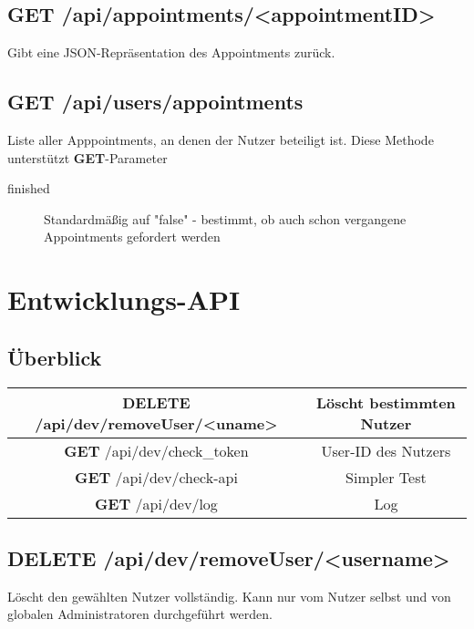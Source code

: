 \documentclass[11pt,a4paper]{article}
\begin{document}
\subsection{\textbf{GET} /api/appointments/<appointmentID>}
Gibt eine JSON-Repräsentation des Appointments zurück.
\subsection{\textbf{GET} /api/users/appointments}
Liste aller Apppointments, an denen der Nutzer beteiligt ist. Diese Methode unterstützt \textbf{GET}-Parameter
\begin{description}
    \item[finished] Standardmäßig auf "false" - bestimmt, ob auch schon vergangene Appointments gefordert werden
\end{description}
\section{Entwicklungs-API}
\subsection{Überblick}

\begin{tabular}{|c|c|}
\hline
\textbf{DELETE} /api/dev/removeUser/<uname> & Löscht bestimmten Nutzer \\
\hline
\textbf{GET} /api/dev/check\_token & User-ID des Nutzers \\
\hline
\textbf{GET} /api/dev/check-api & Simpler Test \\
\hline
\textbf{GET} /api/dev/log & Log \\
\hline
\end{tabular}

\subsection{\textbf{DELETE} /api/dev/removeUser/<username>}
Löscht den gewählten Nutzer vollständig. Kann nur vom Nutzer selbst und von globalen Administratoren durchgeführt werden.
\end{document}

